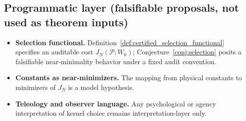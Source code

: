 \subsection{Programmatic layer (falsifiable proposals, not used as theorem inputs)}
\label{app:programmatic_layer_list}

\begin{itemize}
\item \textbf{Selection functional.} Definition~\ref{def:certified_selection_functional} specifies an auditable cost $J_N(\mathcal{P};W_0)$; Conjecture~\ref{conj:selection} posits a falsifiable near-minimality behavior under a fixed audit convention.
\item \textbf{Constants as near-minimizers.} The mapping from physical constants to minimizers of $J_N$ is a model hypothesis.
\item \textbf{Teleology and observer language.} Any psychological or agency interpretation of kernel choice remains interpretation-layer only.
\end{itemize}


